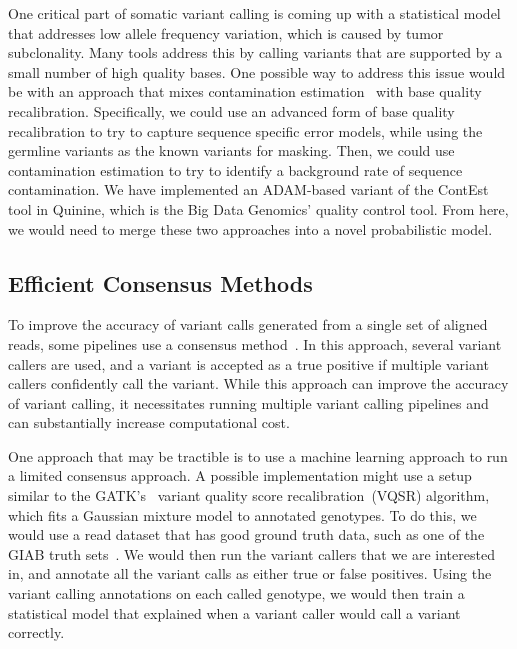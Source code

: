 \documentclass[phd]{ucbthesis}
\begin{document}
One critical part of somatic variant calling is coming up with a statistical
model that addresses low allele frequency variation, which is caused by tumor
subclonality. Many tools address this by calling variants that are supported
by a small number of high quality bases. One possible way to address this issue
would be with an approach that mixes contamination estimation~\cite{cibulskis11}
with base quality recalibration. Specifically, we could use an advanced form of
base quality recalibration to try to capture sequence specific error models,
while using the germline variants as the known variants for masking. Then, we
could use contamination estimation to try to identify a background rate of
sequence contamination. We have implemented an {ADAM}-based variant of
the {ContEst}~\cite{cibulskis11} tool in {Quinine}, which is
the {Big Data Genomics}' quality control tool. From here, we would need
to merge these two approaches into a novel probabilistic model.

\subsection{Efficient Consensus Methods}
\label{sec:efficient-consensus}

To improve the accuracy of variant calls generated from a single set of aligned
reads, some pipelines use a consensus method~\cite{zook15}. In this approach,
several variant callers are used, and a variant is accepted as a true positive
if multiple variant callers confidently call the variant. While this approach
can improve the accuracy of variant calling, it necessitates running multiple
variant calling pipelines and can substantially increase computational cost.

One approach that may be tractible is to use a machine learning approach to run
a limited consensus approach. A possible implementation might use a setup
similar to the {GATK}'s~\cite{depristo11} variant quality score
recalibration~(VQSR) algorithm, which fits a Gaussian mixture model to annotated
genotypes. To do this, we would use a read dataset that has good ground truth
data, such as one of the GIAB truth sets~\cite{zook15}. We would then run the
variant callers that we are interested in, and annotate all the variant calls
as either true or false positives. Using the variant calling annotations on
each called genotype, we would then train a statistical model that explained
when a variant caller would call a variant correctly.
\end{document}

